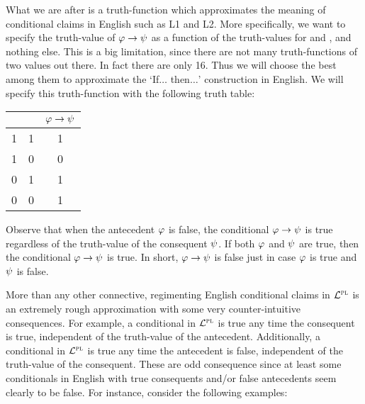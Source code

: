 What we are after is a truth-function which approximates the meaning of conditional claims in English such as L1 and L2.
More specifically, we want to specify the truth-value of $\varphi{}\rightarrow\psi{}$ as a function of the truth-values for \metaA{} and \metaB{}, and nothing else.
This is a big limitation, since there are not many truth-functions of two values out there.
In fact there are only 16.
Thus we will choose the best among them to approximate the `If$\ldots$ then$\ldots$' construction in English.
We will specify this truth-function with the following truth table:

\begin{center}
\begin{tabular}{c|c|c}
\metaA{} & \metaB{} & $\varphi{}\rightarrow\psi{}$\\
\hline
1 & 1 & 1\\
1 & 0 & 0\\
0 & 1 & 1\\
0 & 0 & 1
\end{tabular}
\end{center}
 
Observe that when the antecedent $\varphi$ is false, the conditional $\varphi \rightarrow \psi$ is true regardless of the truth-value of the consequent $\psi$.
If both $\varphi$ and $\psi$ are true, then the conditional $\varphi \rightarrow \psi$ is true.
In short, $\varphi \rightarrow \psi$ is false just in case $\varphi$ is true and $\psi$ is false.

More than any other connective, regimenting English conditional claims in $\mathcal{L}^{\textsc{pl}}$ is an extremely rough approximation with some very counter-intuitive consequences.
For example, a conditional in $\mathcal{L}^{\textsc{pl}}$ is true any time the consequent is true, independent of the truth-value of the antecedent.
Additionally, a conditional in $\mathcal{L}^{\textsc{pl}}$ is true any time the antecedent is false, independent of the truth-value of the consequent.
These are odd consequence since at least some conditionals in English with true consequents and/or false antecedents seem clearly to be false.
For instance, consider the following examples:

\begin{earg}
\end{earg}

